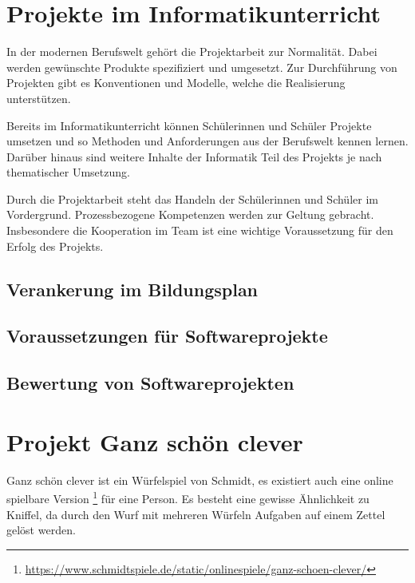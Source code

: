 \documentclass[a4paper,12pt]{article}
\newcommand{\sus}{Schülerinnen und Schüler}
\begin{document}
    \maketitle


\section{Projekte im Informatikunterricht}
    In der modernen Berufswelt gehört die Projektarbeit zur Normalität.
    Dabei werden gewünschte Produkte spezifiziert und umgesetzt.
    Zur Durchführung von Projekten gibt es Konventionen und Modelle, 
    welche die Realisierung unterstützen.
    
    Bereits im Informatikunterricht können \sus{} Projekte umsetzen
    und so Methoden und Anforderungen aus der Berufswelt kennen lernen.
    Darüber hinaus sind weitere Inhalte der Informatik Teil des Projekts 
    je nach thematischer Umsetzung.

    Durch die Projektarbeit steht das Handeln der \sus{} im Vordergrund.
    Prozessbezogene Kompetenzen werden zur Geltung gebracht.
    Insbesondere die Kooperation im Team ist eine wichtige Voraussetzung 
    für den Erfolg des Projekts.

\subsection{Verankerung im Bildungsplan}

\subsection{Voraussetzungen für Softwareprojekte}

\subsection{Bewertung von Softwareprojekten}

\section{Projekt \glqq Ganz schön clever\grqq}
    Ganz schön clever ist ein Würfelspiel von Schmidt,
    es existiert auch eine online spielbare Version 
    \footnote{\url{https://www.schmidtspiele.de/static/onlinespiele/ganz-schoen-clever/}} 
    für eine Person.
    Es besteht eine gewisse Ähnlichkeit zu Kniffel, 
    da durch den Wurf mit mehreren Würfeln Aufgaben auf einem Zettel gelöst werden.
\end{document}
